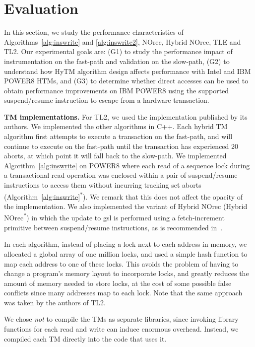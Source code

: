 \section{Evaluation}
\label{sec:eval}
%
In this section, we study the performance characteristics of Algorithms~\ref{alg:inswrite} and \ref{alg:inswrite2}, NOrec, Hybrid NOrec, TLE and TL2.
Our experimental goals are: (G1) to study the performance impact of instrumentation on the fast-path and validation on the slow-path, 
(G2) to understand how HyTM algorithm design affects performance with Intel and IBM POWER8 HTMs, and 
(G3) to determine whether direct accesses can be used to obtain performance improvements on IBM POWER8 using the supported suspend/resume instruction to escape from a hardware transaction.

\vspace{1mm}\noindent\textbf{TM implementations.}
For TL2, we used the implementation published by its authors.
We implemented the other algorithms in C++.
Each hybrid TM algorithm first attempts to execute a transaction on the fast-path, and will continue to execute on the fast-path until the transaction has experienced 20 aborts, at which point it will fall back to the slow-path.
We implemented Algorithm~\ref{alg:inswrite} on POWER8 where each read of a sequence lock during a transactional read operation was enclosed within a pair of suspend/resume instructions to access them without 
incurring tracking set aborts (Algorithm~\ref{alg:inswrite}\textsuperscript{$\ast$}). We remark that this does not affect the opacity of the implementation. 
We also implemented the variant of Hybrid NOrec (Hybrid NOrec\textsuperscript{$\ast$}) in which the update to gsl is performed using a fetch-increment primitive between suspend/resume instructions, as is recommended in~\cite{hynorecriegel}.

In each algorithm, instead of placing a lock next to each address in memory, we allocated a global array of one million locks, and used a simple hash function to map each address to one of these locks.
This avoids the problem of having to change a program's memory layout to incorporate locks, and greatly reduces the amount of memory needed to store locks, at the cost of some possible false conflicts since many addresses map to each lock.
Note that the same approach was taken by the authors of TL2.

We chose \textit{not} to compile the TMs as separate libraries, since invoking library functions for each read and write can induce enormous overhead.
Instead, we compiled each TM directly into the code that uses it.

